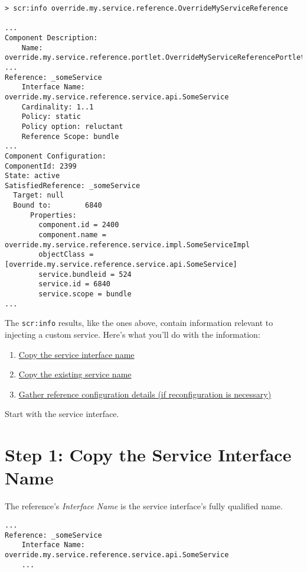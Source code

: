 \begin{verbatim}
> scr:info override.my.service.reference.OverrideMyServiceReference 

...
Component Description:
    Name: override.my.service.reference.portlet.OverrideMyServiceReferencePortlet
...
Reference: _someService
    Interface Name: override.my.service.reference.service.api.SomeService
    Cardinality: 1..1
    Policy: static
    Policy option: reluctant
    Reference Scope: bundle
...
Component Configuration:
ComponentId: 2399
State: active
SatisfiedReference: _someService
  Target: null
  Bound to:        6840
      Properties:
        component.id = 2400
        component.name = override.my.service.reference.service.impl.SomeServiceImpl
        objectClass = [override.my.service.reference.service.api.SomeService]
        service.bundleid = 524
        service.id = 6840
        service.scope = bundle
...
\end{verbatim}

The \texttt{scr:info} results, like the ones above, contain information
relevant to injecting a custom service. Here's what you'll do with the
information:

\begin{enumerate}
\def\labelenumi{\arabic{enumi}.}
\item
  \hyperref[step-1-copy-the-service-interface-name]{Copy the service
  interface name}
\item
  \hyperref[step-2-copy-the-existing-service-name]{Copy the existing
  service name}
\item
  \hyperref[step-3-gather-reference-configuration-details-if-reconfiguration-is-needed]{Gather
  reference configuration details (if reconfiguration is necessary)}
\end{enumerate}

Start with the service interface.

\section{Step 1: Copy the Service Interface
Name}\label{step-1-copy-the-service-interface-name}

The reference's \emph{Interface Name} is the service interface's fully
qualified name.

\begin{verbatim}
...
Reference: _someService
    Interface Name: override.my.service.reference.service.api.SomeService
    ...
\end{verbatim}

